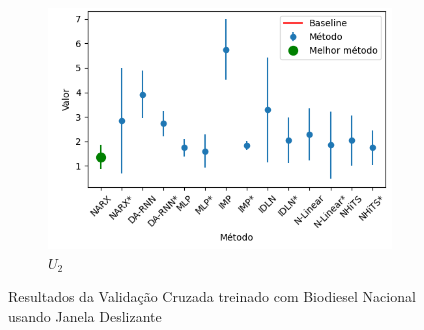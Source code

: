 \begin{figure}[htbp]
\begin{subfigure}[b]{0.3\textwidth}
		\includegraphics[width=\textwidth]{figuras/u2_brasil_results.png}
		\caption{\(U_2\)}
		\label{fig:u2_brasil_results}
	\end{subfigure}
	\caption{Resultados da Validação Cruzada treinado com Biodiesel Nacional usando Janela Deslizante}
	\label{fig:brasil_results}
\end{figure}

